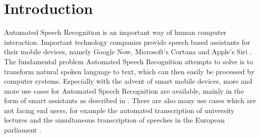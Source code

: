 
\chapter{Introduction}
\label{ch:Introduction}

Automated Speech Recognition is an important way of human computer interaction. Important technology companies provide speech based assistants for their mobile devices, namely Google Now, Microsoft's Cortana and Apple's Siri \cite{yu2016automatic}. The fundamental problem Automated Speech Recognition attempts to solve is to transform natural spoken language to text, which can then easily be processed by computer systems. Especially with the advent of smart mobile devices, more and more use cases for Automated Speech Recognition are available, mainly in the form of smart assistants as described in \cite{lopez2017alexa}. There are also many use cases which are not facing end users, for example the automated transcription of university lectures \cite{muller2016lecture} and the simultaneous transcription of speeches in the European parliament \cite{stuker2007isl}.

